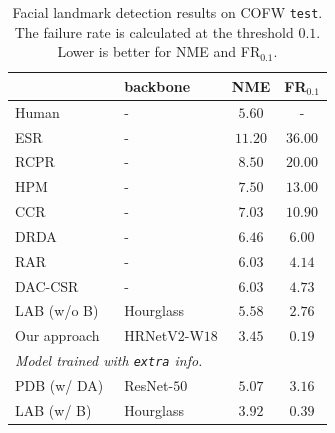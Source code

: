 \documentclass[10pt,journal,compsoc]{IEEEtran}
\begin{document}
\renewcommand{\arraystretch}{1.3}
\begin{table}[!htbp]
\setlength{\tabcolsep}{13pt}
\scriptsize
\centering
\caption{Facial landmark detection results on COFW \texttt{test}. 
The failure rate is calculated at the threshold $0.1$. 
Lower is better for NME and FR$_{0.1}$.
}
\begin{tabular}{l|l|cc }
\hline\noalign{\smallskip}
 & backbone & NME & FR$_{0.1}$\\
\hline

\hline
Human & - & $5.60$ & -\\
ESR \cite{CaoWWS12} &-&$11.20$&$36.00$\\
RCPR \cite{Burgos-ArtizzuPD13}& - &$8.50$ & $20.00$\\
HPM \cite{GhiasiF14}& - &$7.50$ & $13.00$ \\
CCR \cite{FengHKCW15}& -& $7.03$ & $10.90$ \\
DRDA \cite{ZhangKSC16}& - &$6.46$ & $6.00$ \\
RAR \cite{XiaoFXLYK16}& - &$6.03$ & $4.14$ \\
DAC-CSR \cite{FengKC0W17}& - &$6.03$ & $4.73$ \\
LAB (w/o B) \cite{Wu0YWC018}& Hourglass & $5.58$ & $2.76$\\
\hline
Our approach & HRNetV$2$-W$18$ & $\mathbf{3.45}$ & $\mathbf{0.19}$ \\
\hline

\hline
\multicolumn{3}{l}{
\emph {Model trained with \texttt{extra} info.}}\\
\hline
PDB (w/ DA)~\cite{FengKA0W18}& ResNet-$50$ & $5.07$ & $3.16$\\
LAB (w/ B)~\cite{Wu0YWC018}& Hourglass &$3.92$ & $0.39$ \\
\hline
\end{tabular}
\label{table:comparison_cofw_testset}
\end{table}
\end{document}
